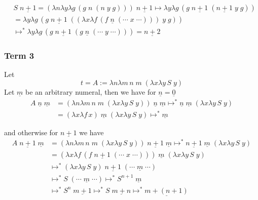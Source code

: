 \documentclass{article}
\begin{document}
\begin{equation*}
\begin{split}
&S\; \underline{n+1} =  (\lambda n \lambda y \lambda g \,(g \; n \; ( n \; y \; g))) \; \underline{n+1} \mapsto  \lambda y \lambda g \,(g \;  \underline{n+1} \; (  \underline{n+1} \; y \; g)) \\
&= \lambda y \lambda g \,(g \;  \underline{n+1} \; ( (\lambda x \lambda f \, (f\; \underline{n}\; (\cdots \; x\; \cdots ))) \; y \; g)) \\
&\mapsto^* \lambda y \lambda g \, (g \;  \underline{n+1} \; (g \;  \underline{n} \; (\cdots \; y \; \cdots ))) = \underline{n+2}
\end{split}
\end{equation*}


\subsubsection*{Term 3}
Let 
\begin{equation*}
t=A:= \lambda n \lambda m \, n \; m \; ( \lambda x \lambda y \, S \; y)
\end{equation*}
Let $\underline{m}$ be an arbitrary numeral, then we have for $\underline{n}=\underline{0}$
\begin{equation*}
\begin{split}
A \; \underline{n} \; \underline{m} &= (\lambda n \lambda m \, n \; m \; ( \lambda x \lambda y \, S \; y)) \; \underline{n} \; \underline{m} \mapsto^*  \underline{n} \; \underline{m} \; ( \lambda x \lambda y \, S \; y) \\
&= (\lambda x \lambda f \, x)\; \underline{m} \; ( \lambda x \lambda y \, S \; y) 
\mapsto^* \underline{m}
\end{split}
\end{equation*}


and otherwise for $\underline{n+1}$ we have
\begin{equation*}
\begin{split}
A \; \underline{n+1} \; \underline{m} &= (\lambda n \lambda m \, n \; m \; ( \lambda x \lambda y \, S \; y)) \; \underline{n+1} \; \underline{m} \mapsto^*  \underline{n+1} \; \underline{m} \; ( \lambda x \lambda y \, S \; y) \\
&= (\lambda x \lambda f \, (f\; \underline{n+1}\; (\cdots \; x \; \cdots))) \; \underline{m} \; ( \lambda x \lambda y \, S \; y) \\
&\mapsto^* ( \lambda x \lambda y \, S \; y) \; \underline{n+1}\; (\cdots \; \underline{m}  \; \cdots) \\
&\mapsto^*  S \; (\cdots \;  \underline{m}  \; \cdots) \mapsto^* S^{n+1} \; \underline{m} \\
&\mapsto^* S^{n} \; \underline{m+1} \mapsto^* S \; \underline{m+n} \mapsto^* \underline{m+(n+1)}
\end{split}
\end{equation*}
\end{document}
